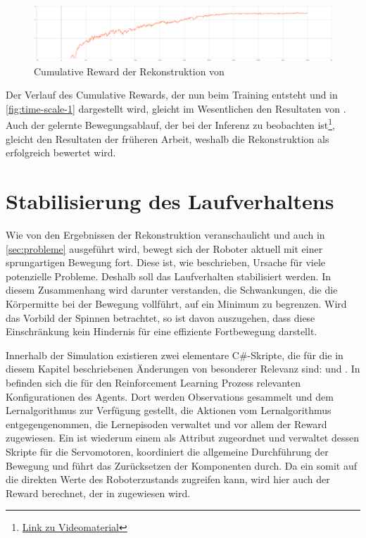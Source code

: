 \begin{figure}[H]
    \centering
    \includegraphics[width=\textwidth]{Bilder/ml-agents/Environment_Cumulative Reward_time-scale-1.pdf}
    \caption{Cumulative Reward der Rekonstruktion von \cite{waidner.2020}}
    \label{fig:time-scale-1}
\end{figure}

Der Verlauf des Cumulative Rewards, der nun beim Training entsteht und in \autoref{fig:time-scale-1} dargestellt wird, gleicht im Wesentlichen den Resultaten von \cite[50]{waidner.2020}.
Auch der gelernte Bewegungsablauf, der bei der Inferenz zu beobachten ist\footnote{\href{https://github.com/yschiebelhut/studienarbeit-doc/raw/master/Videos/SpiderBotDemos/timeScale1.webm}{Link zu Videomaterial}}, gleicht den Resultaten der früheren Arbeit, weshalb die Rekonstruktion als erfolgreich bewertet wird.


\section{Stabilisierung des Laufverhaltens}
\label{sec:stabilisierung}
Wie von den Ergebnissen der Rekonstruktion veranschaulicht und auch in \autoref{sec:probleme} ausgeführt wird, bewegt sich der Roboter aktuell mit einer sprungartigen Bewegung fort.
Diese ist, wie beschrieben, Ursache für viele potenzielle Probleme.
Deshalb soll das Laufverhalten stabilisiert werden.
In diesem Zusammenhang wird darunter verstanden, die Schwankungen, die die Körpermitte bei der Bewegung vollführt, auf ein Minimum zu begrenzen.
Wird das Vorbild der Spinnen betrachtet, so ist davon auszugehen, dass diese Einschränkung kein Hindernis für eine effiziente Fortbewegung darstellt.

Innerhalb der Simulation existieren zwei elementare C\#-Skripte, die für die in diesem Kapitel beschriebenen Änderungen von besonderer Relevanz sind:  und .
In  befinden sich die für den Reinforcement Learning Prozess relevanten Konfigurationen des Agents.
Dort werden Observations gesammelt und dem Lernalgorithmus zur Verfügung gestellt, die Aktionen vom Lernalgorithmus entgegengenommen, die Lernepisoden verwaltet und vor allem der Reward zugewiesen.
Ein  ist wiederum einem  als Attribut zugeordnet und verwaltet dessen Skripte für die Servomotoren, koordiniert die allgemeine Durchführung der Bewegung und führt das Zurücksetzen der Komponenten durch.
Da ein  somit auf die direkten Werte des Roboterzustands zugreifen kann, wird hier auch der Reward berechnet, der in  zugewiesen wird.

